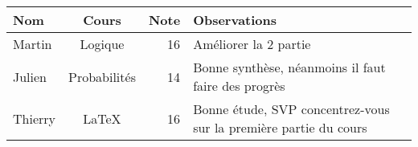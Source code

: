 \documentclass{article}
\begin{document}
\begin{tabular}{|l||c|r|p{4cm}|}
\hline
Nom & Cours & Note & Observations \\
\hline
\hline
Martin & Logique & 16 & Améliorer la 2\up{e} partie \\
\hline
Julien & Probabilités & 14 & Bonne synthèse, néanmoins il faut faire des progrès\\
\hline
Thierry & \LaTeX & 16 & Bonne étude, SVP concentrez-vous sur la première partie du cours\\
\hline
\end{tabular}
\end{document}
